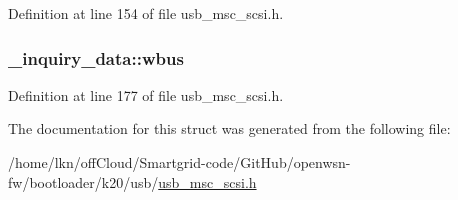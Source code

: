 Definition at line 154 of file usb\+\_\+msc\+\_\+scsi.\+h.

\subsubsection[{\texorpdfstring{wbus}{wbus}}]{ \+\_\+inquiry\+\_\+data\+::wbus}\hypertarget{struct__inquiry__data_a26676289ad526640bc2f40f48b40717d}{}\label{struct__inquiry__data_a26676289ad526640bc2f40f48b40717d}


Definition at line 177 of file usb\+\_\+msc\+\_\+scsi.\+h.



The documentation for this struct was generated from the following file\+:\begin{DoxyCompactItemize}
\item 
/home/lkn/off\+Cloud/\+Smartgrid-\/code/\+Git\+Hub/openwsn-\/fw/bootloader/k20/usb/\hyperlink{usb__msc__scsi_8h}{usb\+\_\+msc\+\_\+scsi.\+h}\end{DoxyCompactItemize}
